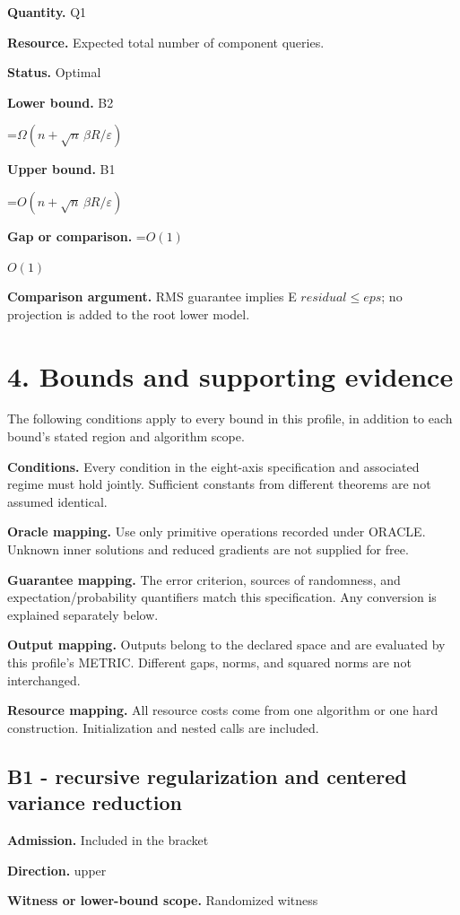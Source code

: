 \documentclass[10pt,a4paper]{article}
\newcommand{\AtlasMath}[1]{\par\begingroup\centering\setbox0=\hbox{$\displaystyle #1$}\ifdim\wd0>1.4\linewidth\typeout{ATLAS WIDE FORMULA: \the\wd0}\fi\ifdim\wd0>\linewidth\resizebox{\linewidth}{!}{\box0}\else\box0\fi\par\endgroup}
\newcommand{\AtlasInlineMath}[1]{\begingroup\setbox0=\hbox{$#1$}\ifdim\wd0>.4\linewidth\endgroup\AtlasMath{#1}\else\endgroup$#1$\fi}
\begin{document}
\textbf{Quantity.} Q1

\textbf{Resource.} Expected total number of component queries.

\textbf{Status.} Optimal

\textbf{Lower bound.} B2

\AtlasMath{\Omega(n+\sqrt n\,\beta R/\varepsilon)}
\textbf{Upper bound.} B1

\AtlasMath{O(n+\sqrt n\,\beta R/\varepsilon)}
\textbf{Gap or comparison.} \AtlasInlineMath{O(1)}

\textbf{Comparison argument.} RMS guarantee implies E $residual\le eps$; no projection is added to the root lower model.

\section{4. Bounds and supporting evidence}
The following conditions apply to every bound in this profile, in addition to each bound's stated region and algorithm scope.

\textbf{Conditions.} Every condition in the eight-axis specification and associated regime must hold jointly. Sufficient constants from different theorems are not assumed identical.

\textbf{Oracle mapping.} Use only primitive operations recorded under ORACLE. Unknown inner solutions and reduced gradients are not supplied for free.

\textbf{Guarantee mapping.} The error criterion, sources of randomness, and expectation/probability quantifiers match this specification. Any conversion is explained separately below.

\textbf{Output mapping.} Outputs belong to the declared space and are evaluated by this profile's METRIC. Different gaps, norms, and squared norms are not interchanged.

\textbf{Resource mapping.} All resource costs come from one algorithm or one hard construction. Initialization and nested calls are included.

\subsection{B1 - recursive regularization and centered variance reduction}
\textbf{Admission.} Included in the bracket

\textbf{Direction.} upper

\textbf{Witness or lower-bound scope.} Randomized witness
\end{document}
